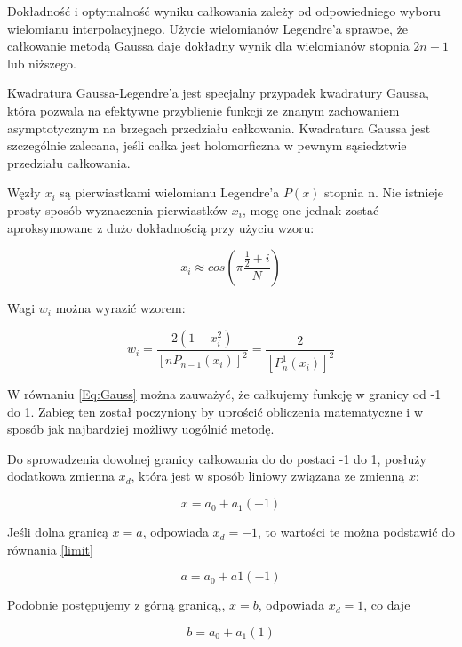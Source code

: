 \documentclass[12pt,twoside]{article}
\begin{document}
Dokładność i optymalność wyniku całkowania zależy od odpowiedniego wyboru wielomianu interpolacyjnego. Użycie wielomianów Legendre'a sprawoe, że całkowanie metodą Gaussa daje dokładny wynik dla wielomianów stopnia $2n-1$ lub niższego. 

Kwadratura Gaussa-Legendre'a jest specjalny przypadek kwadratury Gaussa, która pozwala na efektywne przyblienie funkcji ze znanym zachowaniem asymptotycznym na brzegach przedziału całkowania. Kwadratura Gaussa jest szczególnie zalecana, jeśli całka jest holomorficzna w pewnym sąsiedztwie przedziału całkowania.

Węzły $x_i$ są pierwiastkami wielomianu Legendre'a $P(x)$ stopnia n. Nie istnieje prosty sposób wyznaczenia pierwiastków $x_i$, mogę one jednak zostać aproksymowane z dużo dokładnością przy użyciu wzoru:

\begin{equation}
x_i \approx cos(\pi \frac{\frac{1}{2}+i}{N})
\label{nodes}
\end{equation}

Wagi $w_i$ można wyrazić wzorem:

\begin{equation}
w_i = \frac{2(1-x_i^2)}{[nP_{n-1}(x_i)]^2} = \frac{2}{[P_n^1(x_i)]^2}
\label{Eq:rownanie}
\end{equation}\cite{Lagrange}

W równaniu \eqref{Eq:Gauss} można zauważyć, że całkujemy funkcję w granicy od -1 do 1. Zabieg ten został poczyniony by uprościć obliczenia matematyczne i w sposób jak najbardziej możliwy uogólnić metodę. 

Do sprowadzenia dowolnej granicy całkowania do do postaci -1 do 1, posłuży dodatkowa zmienna $x_d$, która jest w sposób liniowy związana ze zmienną $x$:

\begin{equation}
x = a_0 + a_1(-1)
\label{limit}
\end{equation}

Jeśli dolna granicą $x = a$, odpowiada $x_d = -1$, to wartości te można podstawić do równania \eqref{limit}

\begin{equation}
a = a_0 + a1(-1)
\label{x}
\end{equation} 

Podobnie postępujemy z górną granicą,, $x = b$, odpowiada $x_d = 1$, co daje 

\begin{equation}
b = a_0 + a_1(1)
\label{y}
\end{equation}
\end{document}
